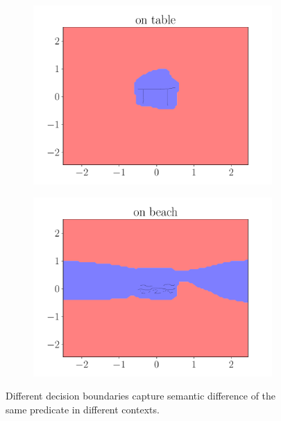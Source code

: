 \begin{figure}[ht]
    \centering
        \begin{subfigure}{0.45\textwidth}
            \centering
            \includegraphics[width=\textwidth]{figures/on_table}
        \end{subfigure}
        \begin{subfigure}{0.45\textwidth}
            \centering
            \includegraphics[width=\textwidth]{figures/on_beach}
        \end{subfigure}
    \caption[Different decision boundaries for the same predicate]{Different decision boundaries capture semantic difference of the same predicate in different contexts.}
    \label{fig:boundaries:2}
\end{figure}

